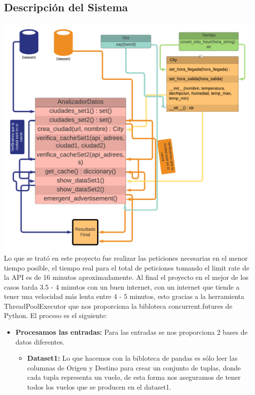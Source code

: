 \documentclass{article}
\begin{document}
\begin{itemize}
        \section{Descripción del Sistema}
            \includegraphics[scale=0.2]{flujo} \\
            Lo que se trató en este proyecto fue realizar las peticiones necesarias en el menor tiempo posible, el tiempo real para el total de peticiones tomando el limit rate de la API es de 16 minutos aproximadamente.
            Al final el proyecto en el mejor de los casos tarda 3.5 - 4 minutos con un buen internet, con un internet que tiende a tener una velocidad más lenta entre 4 - 5 minutos, esto gracias a la herramienta ThreadPoolExecutor que nos proporciona la bibloteca concurrent.futures de Python.
            El proceso es el siguiente:
            \begin{itemize}
                \item \textbf{Procesamos las entradas: } Para las entradas se nos proporciona 2 bases de datos diferentes.
                \begin{itemize}
                    \item \textbf{Dataset1: } Lo que hacemos con la bibloteca de pandas es sólo leer las columnas de Origen y Destino para crear un conjunto de tuplas, donde cada tupla representa un vuelo, de esta forma nos aseguramos de tener todos los vuelos que se producen en el dataset1.

\end{itemize}
\end{itemize}
\end{itemize}
\end{document}
